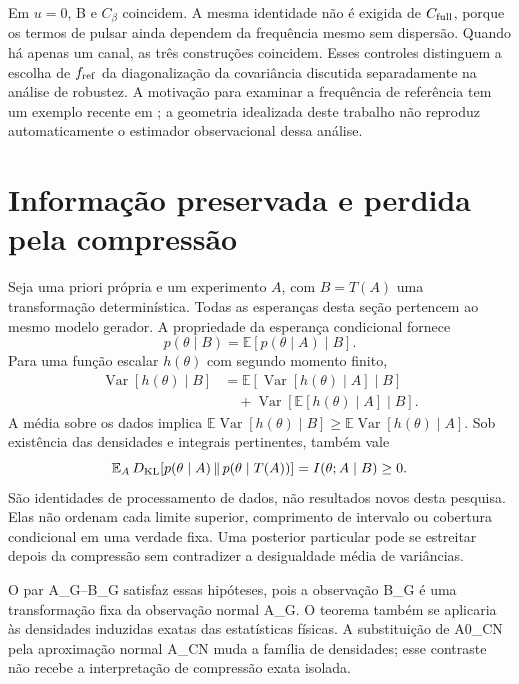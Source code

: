 Em \(u=0\), B e \(C_\beta\) coincidem. A mesma identidade não é exigida
de \(C_{\rm full}\), porque os termos de pulsar ainda dependem da frequência
mesmo sem dispersão. Quando há apenas um canal, as três construções coincidem.
Esses controles distinguem a escolha de \(f_{\rm ref}\) da diagonalização
da covariância discutida separadamente na análise de robustez. A motivação
para examinar a frequência de referência tem um exemplo recente em
\textcite{zhao2026}; a geometria idealizada deste trabalho não reproduz
automaticamente o estimador observacional dessa análise.

\section{Informação preservada e perdida pela compressão}

Seja uma priori própria e um experimento \(A\), com \(B=T(A)\) uma
transformação determinística. Todas as esperanças desta seção pertencem
ao mesmo modelo gerador. A propriedade da esperança condicional fornece
\begin{equation}
 p(\theta\mid B)=\mathbb E\!\left[p(\theta\mid A)\mid B\right].
 \label{eq:comp-posterior-condicional}
\end{equation}
Para uma função escalar \(h(\theta)\) com segundo momento finito,
\begin{align}
 \operatorname{Var}[h(\theta)\mid B]
 &=\mathbb E\!\left[\operatorname{Var}[h(\theta)\mid A]\mid B\right]
 \nonumber\\
 &\quad+\operatorname{Var}\!\left[\mathbb E[h(\theta)\mid A]\mid B\right].
 \label{eq:comp-variancia}
\end{align}
A média sobre os dados implica
\(\mathbb E\operatorname{Var}[h(\theta)\mid B]\geq
\mathbb E\operatorname{Var}[h(\theta)\mid A]\).
Sob existência das densidades e integrais pertinentes, também vale
\begin{equation}
 \mathbb E_A\,D_{\rm KL}\!\left[p(\theta\mid A)\,\Vert\,
                     p(\theta\mid T(A))\right]
 =I(\theta;A\mid B)\geq0.
 \label{eq:comp-informacao}
\end{equation}
São identidades de processamento de dados, não resultados novos desta pesquisa.
Elas não ordenam cada limite superior, comprimento de intervalo ou cobertura
condicional em uma verdade fixa. Uma posterior particular pode se estreitar
depois da compressão sem contradizer a desigualdade média de variâncias.

O par A\_G--B\_G satisfaz essas hipóteses, pois a observação B\_G é uma
transformação fixa da observação normal A\_G. O teorema também se aplicaria
às densidades induzidas exatas das estatísticas físicas. A substituição
de A0\_CN pela aproximação normal A\_CN muda a família de densidades;
esse contraste não recebe a interpretação de compressão exata isolada.

